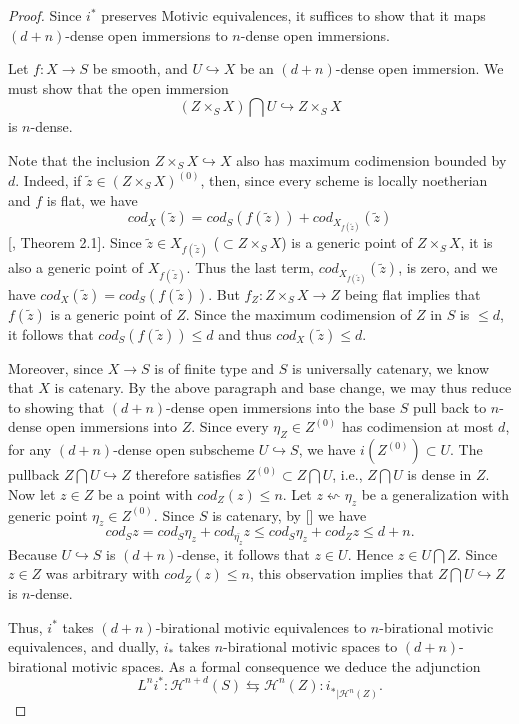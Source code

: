         \begin{proof}
       Since $i^*$ preserves Motivic equivalences, it suffices to show that it maps $(d+n)$-dense open immersions to $n$-dense open immersions.
        
         Let $f:X\to S$ be smooth, and $U\hookrightarrow X$ be an $(d+n)$-dense open immersion. We must show that the open immersion $$(Z\times_SX)\bigcap U\hookrightarrow Z\times_SX$$ is $n$-dense. 
         
         Note that the inclusion $Z\times_SX\hookrightarrow X$ also has maximum codimension bounded by $d$. Indeed, if $\tilde{z}\in (Z\times_SX)^{(0)}$, then, since every scheme is locally noetherian and $f$ is flat, we have $$cod_X(\tilde{z})=cod_S(f(\tilde{z}))+cod_{X_{{f(\tilde{z})}}}(\tilde{z})$$ [\cite{bachmann2019voevodsky}, Theorem 2.1]. Since $\tilde{z}\in X_{{f(\tilde{z})}}$ ($\subset Z\times_SX$) is a generic point of $Z\times_SX$, it is also a generic point of $X_{{f(\tilde{z})}}$. Thus the last term, $cod_{X_{{f(\tilde{z})}}}(\tilde{z})$, is zero, and we have $cod_X(\tilde{z})=cod_S(f(\tilde{z}))$. But $f_Z: Z\times_SX\to Z$ being flat implies that $f(\tilde{z})$ is a generic point of $Z$. Since the maximum codimension of $Z$ in $S$ is $\leq d$, it follows that $cod_S(f(\tilde{z}))\leq d$ and thus $cod_X(\tilde{z})\leq d$.
          
          
Moreover, since $X\to S$ is of finite type and $S$ is universally catenary, we know that $X$ is catenary. By the above paragraph and base change, we may thus reduce to showing that $(d+n)$-dense open immersions into the base $S$ pull back to $n$-dense open immersions into $Z$. Since every $\eta_Z\in Z^{(0)}$ has codimension at most $d$, for any $(d+n)$-dense open subscheme $U\hookrightarrow S$, we have $i(Z^{(0)})\subset U$. The pullback $Z\bigcap U\hookrightarrow Z$ therefore satisfies $Z^{(0)}\subset Z\bigcap U$, i.e., $Z\bigcap U$ is dense in $Z$. Now let $z\in Z$ be a point with $cod_Z(z)\leq n$. Let $z\leftsquigarrow \eta_z$ be a generalization with generic point $\eta_z\in Z^{(0)}$. Since $S$ is catenary, by [\cite[\href{https://stacks.math.columbia.edu/tag/02I6}{Lemma 02I6}]{stacks-project}] we have $$cod_Sz=cod_S\eta_z+cod_{\bar{{\eta_{z}}}} z\leq cod_S\eta_z+cod_{Z} z\leq  d+n.$$  Because $U\hookrightarrow S$ is $(d+n)$-dense, it follows that $z\in U$. Hence $z\in U\bigcap Z$. Since $z\in Z$ was arbitrary with $cod_Z(z)\leq n$, this observation implies that $Z\bigcap U\hookrightarrow Z$ is $n$-dense.
          
          Thus, $i^*$ takes $(d+n)$-birational motivic equivalences to $n$-birational motivic equivalences, and dually, $i_*$ takes $n$-birational motivic spaces to $(d+n)$-birational motivic spaces. As a formal consequence we deduce the adjunction $$L^{n}i^*: \mathcal{H}^{{n+d}}(S) \leftrightarrows \mathcal{H}^{n}(Z):{i^{}_{*}}_{|\mathcal{H}^{n}(Z)}.$$
\end{proof}

